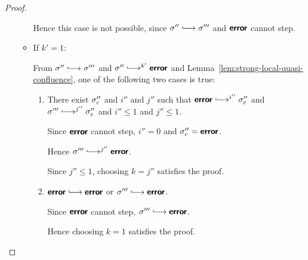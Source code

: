 \begin{proof}
\begin{enumerate}
\begin{itemize}
        Hence this case is not possible, since $\conf'' \parstepsto
        \conf'''$ and $\textbf{\textsf{error}}$ cannot step.

      \item If $k' = 1$:

        From $\conf'' \parstepsto \conf'''$ and $\conf''
        \parstepsto^{k'} \error$ and
        Lemma~\ref{lem:strong-local-quasi-confluence}, one of the
        following two cases is true:

        \begin{enumerate}
        \item There exist $\sigma_c''$ and $i''$ and $j''$ such that
          $\error \parstepsto^{i''} \conf_c''$ and $\conf'''
          \parstepsto^{j''} \conf_c''$ and $i'' \leq 1$ and $j''
          \leq 1$.

          Since $\textbf{\textsf{error}}$ cannot step, $i'' = 0$ and $\sigma''_c =
          \textbf{\textsf{error}}$.

          Hence $\conf''' \parstepsto^{j''} \error$.


          Since $j'' \leq 1$, choosing $k = j''$ satisfies the proof.

        \item $\error \parstepsto \error$ or $\conf''' \parstepsto
          \error$.

          Since $\textbf{\textsf{error}}$ cannot step, $\conf''' \parstepsto \error$.

          Hence choosing $k = 1$ satisfies the proof.

        \end{enumerate}

      \end{itemize}

  \end{enumerate}

\end{proof}

